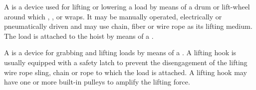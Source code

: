 \begin{module}[id=hoist]
  \begin{definition}
    A  is a device used for lifting or lowering a load by means of a drum or
    lift-wheel around which , , or
     wraps. It may be manually operated, electrically or pneumatically
    driven and may use chain, fiber or wire rope as its lifting medium. The load is
    attached to the hoist by means of a .
  \end{definition}

  \begin{definition}
    A  is a device for grabbing and lifting loads by means of a
    . A lifting hook is usually equipped with a safety latch to prevent the
    disengagement of the lifting wire rope sling, chain or rope to which the load is
    attached. A lifting hook may have one or more built-in pulleys to amplify the lifting
    force.
  \end{definition}
\end{module}
